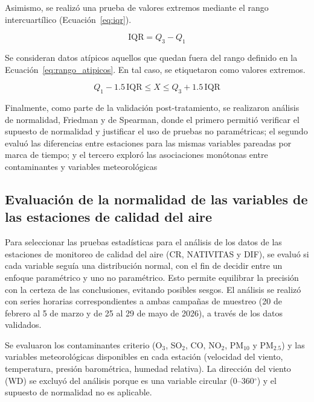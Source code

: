 Asimismo, se realizó una prueba de valores extremos mediante el rango
intercuartílico (Ecuación~\ref{eq:iqr}).

\begin{equation}
\mathrm{IQR} = Q_3 - Q_1
\label{eq:iqr}
\end{equation}

Se consideran datos atípicos aquellos que quedan fuera del rango
definido en la Ecuación~\ref{eq:rango_atipicos}. En tal caso, se
etiquetaron como valores extremos.

\begin{equation}
Q_1 - 1.5\,\mathrm{IQR} \le X \le Q_3 + 1.5\,\mathrm{IQR}
\label{eq:rango_atipicos}
\end{equation}

Finalmente, como parte de la validación post-tratamiento, se 
realizaron análisis de normalidad, Friedman y de Spearman, donde el 
primero permitió verificar el supuesto de normalidad y justificar el 
uso de pruebas no paramétricas; el segundo evaluó las diferencias 
entre estaciones para las mismas variables pareadas por marca de 
tiempo; y el tercero exploró las asociaciones monótonas entre 
contaminantes y variables meteorológicas

\subsection{Evaluación de la normalidad de las variables de las estaciones de calidad 
del aire}
\label{subsec:normalidad}

Para seleccionar las pruebas estadísticas para el análisis de los 
datos de las estaciones de monitoreo de calidad del aire (CR, NATIVITAS y DIF), 
se evaluó si cada variable seguía una distribución normal, con el fin de decidir 
entre un enfoque paramétrico y uno no paramétrico. Esto permite equilibrar 
la precisión con la certeza de las conclusiones, evitando posibles sesgos. El análisis se realizó con series 
horarias correspondientes a ambas campañas de muestreo (20 de febrero al 5 de marzo y 
de 25 al 29 de mayo de 2026), a través de los datos validados. 

Se evaluaron los contaminantes criterio (O$_3$, SO$_2$, CO, NO$_2$, PM$_{10}$ y PM$_{2.5}$) 
y las variables meteorológicas disponibles en cada estación (velocidad del viento, 
temperatura, presión barométrica, humedad relativa). La dirección del viento (WD) se 
excluyó del análisis porque es una variable circular (0--360$^\circ$) y el supuesto de 
normalidad no es aplicable. 

